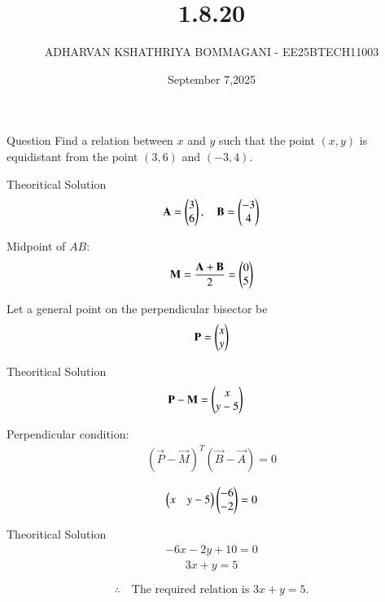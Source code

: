 \documentclass{beamer}
\title 
{1.8.20}
\date{September 7,2025}
\author 
{ADHARVAN KSHATHRIYA BOMMAGANI - EE25BTECH11003}
\begin{document}
\frame{\titlepage}

\begin{frame}{Question}
Find a relation between $x$ and $y$ such that the point $(x,y)$ is equidistant from the point $(3,6)$ and $(-3,4)$.
\end{frame}

\begin{frame}{Theoritical Solution}
\begin{align}
\mathbf{A} = \begin{pmatrix}3 \\ 6\end{pmatrix}, \quad
\mathbf{B} = \begin{pmatrix}-3 \\ 4\end{pmatrix}
\end{align}

Midpoint of $AB$:
\begin{align}
\mathbf{M} = \frac{\mathbf{A}+\mathbf{B}}{2}
= \begin{pmatrix}0 \\ 5\end{pmatrix}
\end{align}

Let a general point on the perpendicular bisector be
\begin{align}
\mathbf{P} = \begin{pmatrix}x \\ y\end{pmatrix}
\end{align}
\end{frame}

\begin{frame}{Theoritical Solution}
\begin{align}
\mathbf{P}-\mathbf{M} &= \begin{pmatrix}x \\ y-5\end{pmatrix}
\end{align}

Perpendicular condition:
\begin{align}
(\vec{P}-\vec{M})^T (\vec{B}-\vec{A}) = 0
\end{align}

\begin{align}
\begin{pmatrix}x & y-5\end{pmatrix}\begin{pmatrix}-6 \\ -2\end{pmatrix} = 0
\end{align}
\end{frame}

\begin{frame}{Theoritical Solution}
\begin{align}
-6x - 2y + 10 = 0
\end{align}
\begin{align}
3x + y = 5
\end{align}

\[
\therefore \quad \text{The required relation is } 3x+y=5.
\]
\end{frame}
\end{document}
